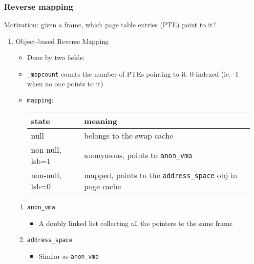\documentclass[11pt]{article}
\begin{document}
\subsubsection{Reverse mapping}
\label{sec:orgd52d353}
Motivation: given a frame, which page table entries (PTE) point to it?
\begin{enumerate}
\item Object-based Reverse Mapping
\label{sec:org7272aa9}
\begin{itemize}
\item Done by two fields:
\item \texttt{\_mapcount} counts the number of PTEs pointing to it. 0-indexed (ie. -1 when
no one points to it)
\item \texttt{mapping}:
\begin{center}
\begin{tabular}{ll}
state & meaning\\
\hline
null & belongs to the swap cache\\
non-null, lsb=1 & anonymous, points to \texttt{anon\_vma}\\
non-null, lsb=0 & mapped, points to the \texttt{address\_space} obj in page cache\\
\end{tabular}
\end{center}
\end{itemize}
\begin{enumerate}
\item \texttt{anon\_vma}
\label{sec:org8e5a7b1}
\begin{itemize}
\item A doubly linked list collecting all the pointers to the same frame
\end{itemize}
\item \texttt{address\_space}
\label{sec:org487ae23}
\begin{itemize}
\item Similar as \texttt{anon\_vma}
\end{itemize}
\end{enumerate}
\end{enumerate}
\end{document}
